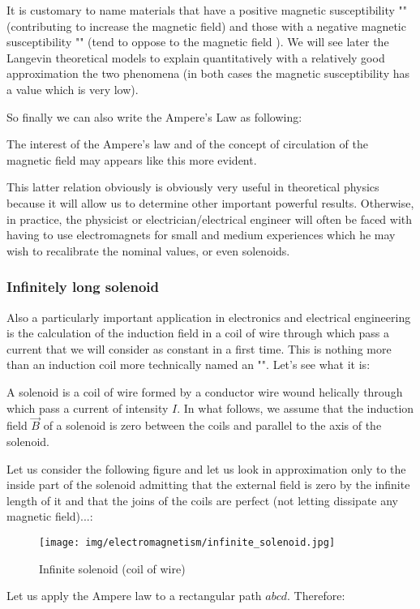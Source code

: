 	It is customary to name materials that have a positive magnetic susceptibility "" (contributing to increase the magnetic field) and those with a negative magnetic susceptibility "" (tend to oppose to the magnetic field ). We will see later the Langevin theoretical models to explain quantitatively with a relatively good approximation the two phenomena (in both cases the magnetic susceptibility has a value which is very low).
	
	So finally we can also write the Ampere's Law as following:
	
	The interest of the Ampere's law and of the concept of circulation of the magnetic field may appears like this more evident.
	
	This latter relation obviously is obviously very useful in theoretical physics because it will allow us to determine other important powerful results. Otherwise, in practice, the physicist or electrician/electrical engineer will often be faced with having to use electromagnets for small and medium experiences which he may wish to recalibrate the nominal values, or even solenoids.
	
	
	\subsubsection{Infinitely long solenoid}\label{solenoid}
	Also a particularly important application in electronics and electrical engineering is the calculation of the induction field in a coil of wire through which pass a current that we will consider as constant in a first time. This is nothing more than an induction coil more technically named an "". Let's see what it is:
	
	A solenoid is a coil of wire formed by a conductor wire wound helically through which pass a current of intensity $I$. In what follows, we assume that the induction field $\vec{B}$ of a solenoid is zero between the coils and parallel to the axis of the solenoid.
	
	Let us consider the following figure and let us look in approximation only to the inside part of the solenoid admitting that the external field is zero by the infinite length of it and that the joins of the coils are perfect (not letting dissipate any magnetic field)...:
	
	\begin{figure}[H]
		\centering
		\texttt{[image: img/electromagnetism/infinite\_solenoid.jpg]}
		\caption{Infinite solenoid (coil of wire)}
	\end{figure}
	Let us apply the Ampere law to a rectangular path $abcd$. Therefore:
	
